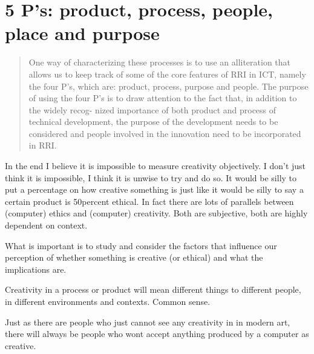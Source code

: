 \section{5 P’s: product, process, people, place and purpose}

\begin{quote}
  One way of characterizing these processes is to use an alliteration that allows us to keep track of some of the core features of RRI in ICT, namely the four P's, which are: product, process, purpose and people. The purpose of using the four P's is to draw attention to the fact that, in addition to the widely recog- nized importance of both product and process of technical development, the purpose of the development needs to be considered and people involved in the innovation need to be incorporated in RRI. \citep[p.203, my emphasis]{Stahl2013}
\end{quote}

\begin{comment}
  combine the 4 P’s with purpose//
  5 P’s: product, process, people, place and purpose//
  Why is the purpose important?//
  Interpreting or Measuring?//
  Maybe we should not be looking for metrics but rather guidelines for interpretations of creativity.
\end{comment}

\begin{draft}
  In the end I believe it is impossible to measure creativity objectively. I don’t just think it is impossible, I think it is unwise to try and do so. It would be silly to put a percentage on how creative something is just like it would be silly to say a certain product is 50percent ethical. In fact there are lots of parallels between (computer) ethics and (computer) creativity. Both are subjective, both are highly dependent on context.

  What is important is to study and consider the factors that influence our perception of whether something is creative (or ethical) and what the implications are.

  Creativity in a process or product will mean different things to different people, in different environments and contexts.
  Common sense.

  Just as there are people who just cannot see any creativity in in modern art, there will always be people who wont accept anything produced by a computer as creative.
\end{draft}

